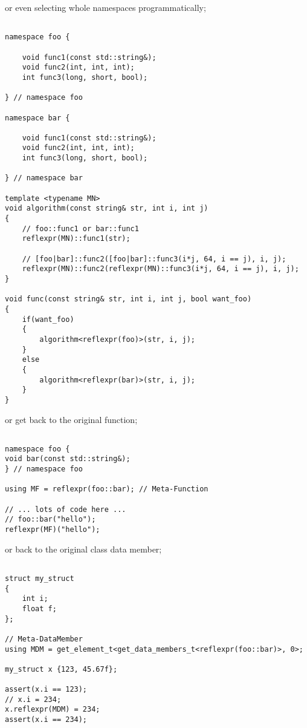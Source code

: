 or even selecting whole namespaces programmatically;

\begin{verbatim}

namespace foo {

	void func1(const std::string&);
	void func2(int, int, int);
	int func3(long, short, bool);

} // namespace foo

namespace bar {

	void func1(const std::string&);
	void func2(int, int, int);
	int func3(long, short, bool);

} // namespace bar

template <typename MN>
void algorithm(const string& str, int i, int j)
{
	// foo::func1 or bar::func1
	reflexpr(MN)::func1(str);

	// [foo|bar]::func2([foo|bar]::func3(i*j, 64, i == j), i, j);
	reflexpr(MN)::func2(reflexpr(MN)::func3(i*j, 64, i == j), i, j);
}

void func(const string& str, int i, int j, bool want_foo)
{
	if(want_foo)
	{
		algorithm<reflexpr(foo)>(str, i, j);
	}
	else 
	{
		algorithm<reflexpr(bar)>(str, i, j);
	}
}

\end{verbatim}

or get back to the original function;

\begin{verbatim}

namespace foo {
void bar(const std::string&);
} // namespace foo

using MF = reflexpr(foo::bar); // Meta-Function

// ... lots of code here ...
// foo::bar("hello");
reflexpr(MF)("hello");

\end{verbatim}

or back to the original class data member;

\begin{verbatim}

struct my_struct
{
	int i;
	float f;
};

// Meta-DataMember
using MDM = get_element_t<get_data_members_t<reflexpr(foo::bar)>, 0>;

my_struct x {123, 45.67f};

assert(x.i == 123);
// x.i = 234;
x.reflexpr(MDM) = 234;
assert(x.i == 234);

\end{verbatim}

